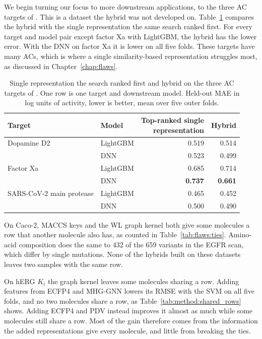 We begin turning our focus to more downstream applications, to the three AC targets of \citet{Dablander2023}. This is a dataset the hybrid was not developed on. Table~\ref{tab:method:opig_qsar} compares the hybrid with the single representation the same search ranked first. For every target and model pair except factor Xa with LightGBM, the hybrid has the lower error. With the DNN on factor Xa it is lower on all five folds. These targets have many ACs, which is where a single similarity-based representation struggles most, as discussed in Chapter~\ref{chap:flaws}.

\begin{table}[htbp]
\centering
\begin{tabular}{@{}llrr@{}}
\toprule
Target & Model & \makecell[r]{Top-ranked single\\representation} & Hybrid \\
\midrule
Dopamine D2 & LightGBM & 0.519 & 0.514 \\
 & DNN & 0.523 & 0.499 \\
Factor Xa & LightGBM & 0.685 & 0.714 \\
 & DNN & \textbf{0.737} & \textbf{0.661} \\
SARS-CoV-2 main protease & LightGBM & 0.465 & 0.452 \\
 & DNN & 0.500 & 0.490 \\
\bottomrule
\end{tabular}
\caption[Hybrid on three activity-cliff targets.]{Single representation the search ranked first and hybrid on the three AC targets of \citet{Dablander2023}. One row is one target and downstream model. Held-out MAE in log units of activity, lower is better, mean over five outer folds.}
\label{tab:method:opig_qsar}
\end{table}

On Caco-2, MACCS keys and the WL graph kernel both give some molecules a row that another molecule also has, as counted in Table~\ref{tab:flaws:ties}. Amino-acid composition does the same to 432 of the 659 variants in the EGFR scan, which differ by single mutations. None of the hybrids built on these datasets leaves two samples with the same row.


On hERG $K_i$ the graph kernel leaves some molecules sharing a row. Adding features from ECFP4 and MHG-GNN lowers its RMSE with the SVM on all five folds, and no two molecules share a row, as Table~\ref{tab:method:shared_rows} shows. Adding ECFP4 and PDV instead improves it almost as much while some molecules still share a row. Most of the gain therefore comes from the information the added representations give every molecule, and little from breaking the ties.

